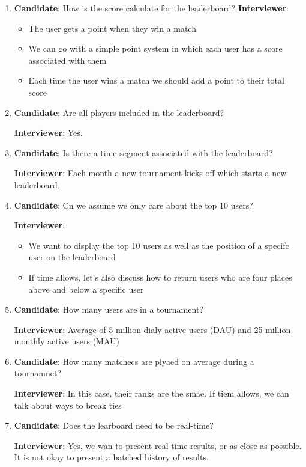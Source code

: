 \documentclass{report}
\theoremstyle{definition}
\begin{document}
\begin{enumerate}
\item

\textbf{Candidate}: How is the score calculate for the leaderboard?
\textbf{Interviewer}:

\begin{itemize}
\item
The user gets a point when they win a match
\item
We can go with a simple point system in which each user has a score associated with them
\item
Each time the user wins a match we should add a point to their total score
\end{itemize}

\item

\textbf{Candidate}: Are all players included in the leaderboard?

\textbf{Interviewer}: Yes.

\item
\textbf{Candidate}: Is there a time segment associated with the leaderboard?

\textbf{Interviewer}: Each month a new tournament kicks off which starts a new leaderboard.

\item
\textbf{Candidate}: Cn we assume we only care about the top 10 users?

\textbf{Interviewer}:

\begin{itemize}
\item
We want to display the top 10 users as well as the position of a specifc user on the leaderboard
\item
If time allows, let's also discuss how to return users who are four places above and below a specific user
\end{itemize}

\item
\textbf{Candidate}: How many users are in a tournament?

\textbf{Interviewer}: Average of 5 million dialy active users (DAU) and 25 million monthly active users (MAU)

\item
\textbf{Candidate}: How many matchecs are plyaed on average during a tournamnet?

\textbf{Interviewer}: In this case, their ranks are the smae. If tiem allows, we can talk about ways to break ties

\item
\textbf{Candidate}: Does the learboard need to be real-time?

\textbf{Interviewer}: Yes, we wan to present real-time results, or as close as possible. It is not okay to present a batched history of results.
\end{enumerate}
\end{document}
